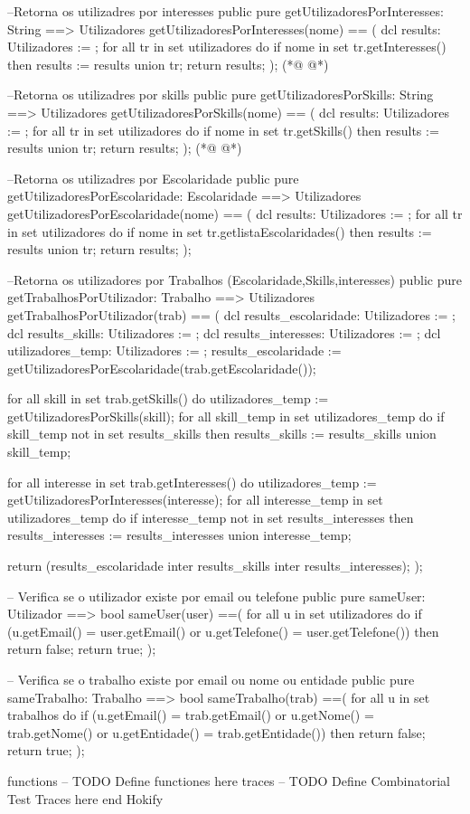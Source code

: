 \begin{vdmpp}[breaklines=true]
 --Retorna os utilizadres por interesses
 public pure getUtilizadoresPorInteresses: String ==> Utilizadores
 getUtilizadoresPorInteresses(nome) == (
  dcl results: Utilizadores := {};
  for all tr in set utilizadores do
   if nome in set tr.getInteresses() then
    results := results union {tr};
  return results;
 );
(*@
\label{getUtilizadoresPorSkills:137}
@*)
 
 --Retorna os utilizadres por skills
 public pure getUtilizadoresPorSkills: String ==> Utilizadores
 getUtilizadoresPorSkills(nome) == (
  dcl results: Utilizadores := {};
  for all tr in set utilizadores do
   if nome in set tr.getSkills() then
    results := results union {tr};
  return results;
 );
(*@
\label{getUtilizadoresPorEscolaridade:147}
@*)

 --Retorna os utilizadres por Escolaridade
 public pure getUtilizadoresPorEscolaridade: Escolaridade ==> Utilizadores
 getUtilizadoresPorEscolaridade(nome) == (
  dcl results: Utilizadores := {};
  for all tr in set utilizadores do
   if nome in set tr.getlistaEscolaridades() then
    results := results union {tr};
  return results;
 );
 
 --Retorna os utilizadores por Trabalhos (Escolaridade,Skills,interesses)
 public pure getTrabalhosPorUtilizador: Trabalho ==> Utilizadores
 getTrabalhosPorUtilizador(trab) == (
  dcl results_escolaridade: Utilizadores := {};
  dcl results_skills: Utilizadores := {};
  dcl results_interesses: Utilizadores := {};
  dcl utilizadores_temp: Utilizadores := {};
  results_escolaridade := getUtilizadoresPorEscolaridade(trab.getEscolaridade());
  
  for all skill in set trab.getSkills() do
   utilizadores_temp := getUtilizadoresPorSkills(skill);
   for all skill_temp in set utilizadores_temp do
    if skill_temp not in set results_skills then
     results_skills := results_skills union {skill_temp};
     
  for all interesse in set trab.getInteresses() do
   utilizadores_temp := getUtilizadoresPorInteresses(interesse);
   for all interesse_temp in set utilizadores_temp do
    if interesse_temp not in set results_interesses then
     results_interesses := results_interesses union {interesse_temp};
     
  return (results_escolaridade inter results_skills inter results_interesses);
 );
 
 -- Verifica se o utilizador existe por email ou telefone
 public pure sameUser: Utilizador ==> bool
 sameUser(user) ==(
  for all u in set utilizadores do
   if (u.getEmail() = user.getEmail() or 
     u.getTelefone() = user.getTelefone()) then
    return false;
  return true;
 );
 
 -- Verifica se o trabalho existe por email ou nome ou entidade
 public pure sameTrabalho: Trabalho ==> bool
 sameTrabalho(trab) ==(
  for all u in set trabalhos do
   if (u.getEmail() = trab.getEmail() or 
     u.getNome() = trab.getNome() or 
     u.getEntidade() = trab.getEntidade()) then
    return false;
  return true;
 );
 
functions
-- TODO Define functiones here
traces
-- TODO Define Combinatorial Test Traces here
end Hokify
\end{vdmpp}
